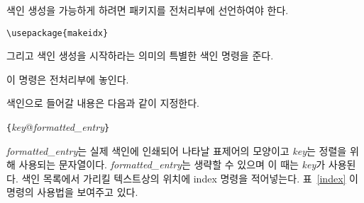 색인 생성을 가능하게 하려면  패키지를 전처리부에 선언하여야 한다.
\begin{lscommand}
\verb|\usepackage{makeidx}|
\end{lscommand}
\noindent 그리고 색인 생성을 시작하라는 의미의 특별한 색인 명령을 준다.
\begin{lscommand}
\end{lscommand}
\noindent 이 명령은 전처리부에 놓인다.


색인으로 들어갈 내용은 다음과 같이 지정한다.
\begin{lscommand}
  \verb|{|\emph{key}@\emph{formatted\_entry}\verb|}|
\end{lscommand}
\noindent
\emph{formatted\_entry}는 실제 색인에 인쇄되어 나타날 표제어의 모양이고 \emph{key}는 정렬을 위해 사용되는 문자열이다. \emph{formatted\_entry}는 생략할 수 있으며 이 때는 \emph{key}가 사용된다.
색인 목록에서 가리킬 텍스트상의 위치에 index 명령을 적어넣는다. 표~\ref{index}\가 
이 명령의 사용법을 보여주고 있다.

